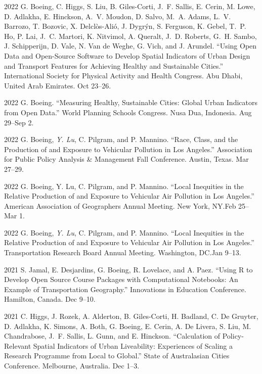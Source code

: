 \documentclass[11pt,letterpaper]{report}
\begin{document}
\begin{tablist}
        \item[2022] \tab{}G. Boeing, C. Higgs, S. Liu, B. Giles-Corti, J.~F. Sallis, E. Cerin, M. Lowe, D. Adlakha, E. Hinckson, A.~V. Moudon, D. Salvo, M.~A. Adams, L.~V. Barrozo, T. Bozovic, X. Delclòs-Alió, J. Dygrýn, S. Ferguson, K. Gebel, T.~P. Ho, P. Lai, J.~C. Martori, K. Nitvimol, A. Queralt, J.~D. Roberts, G.~H. Sambo, J. Schipperijn, D. Vale, N. Van de Weghe, G. Vich, and J. Arundel. \enquote{Using Open Data and Open-Source Software to Develop Spatial Indicators of Urban Design and Transport Features for Achieving Healthy and Sustainable Cities.} International Society for Physical Activity and Health Congress. Abu Dhabi, United Arab Emirates. Oct 23--26.

        \item[2022] \tab{}G. Boeing. \enquote{Measuring Healthy, Sustainable Cities: Global Urban Indicators from Open Data.} World Planning Schools Congress. Nusa Dua, Indonesia. Aug 29--Sep 2.

        \item[2022] \tab{}G. Boeing, \textit{Y. Lu}, C. Pilgram, and P. Mannino. \enquote{Race, Class, and the Production of and Exposure to Vehicular Pollution in Los Angeles.} Association for Public Policy Analysis \& Management Fall Conference. Austin, Texas. Mar 27--29.

        \item[2022] \tab{}G. Boeing, Y. Lu, C. Pilgram, and P. Mannino. \enquote{Local Inequities in the Relative Production of and Exposure to Vehicular Air Pollution in Los Angeles.} American Association of Geographers Annual Meeting. New York, NY.\@ Feb 25--Mar 1.

        \item[2022] \tab{}G. Boeing, \textit{Y. Lu}, C. Pilgram, and P. Mannino. \enquote{Local Inequities in the Relative Production of and Exposure to Vehicular Air Pollution in Los Angeles.} Transportation Research Board Annual Meeting. Washington, DC.\@ Jan 9--13.

        \item[2021] \tab{}S. Jamal, E. Desjardins, G. Boeing, R. Lovelace, and A. Paez. \enquote{Using R to Develop Open Source Course Packages with Computational Notebooks: An Example of Transportation Geography.} Innovations in Education Conference. Hamilton, Canada. Dec 9--10.

        \item[2021] \tab{}C. Higgs, J. Rozek, A. Alderton, B. Giles-Corti, H. Badland, C. De Gruyter, D. Adlakha, K. Simons, A. Both, G. Boeing, E. Cerin, A. De Livera, S. Liu, M. Chandrabose, J.~F. Sallis, L. Gunn, and E. Hinckson. \enquote{Calculation of Policy-Relevant Spatial Indicators of Urban Liveability: Experiences of Scaling a Research Programme from Local to Global.} State of Australasian Cities Conference. Melbourne, Australia. Dec 1--3.


\end{tablist}
\end{document}
